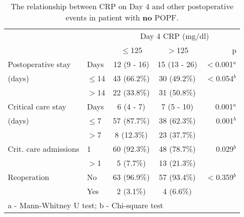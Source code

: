 \begin{table}[p]
	\centering
	\caption{The relationship between CRP on Day 4 and other postoperative events in patient with \textbf{no} POPF.}
	\label{table:crp_comp_CRP4_vs_LOS}
	\renewcommand{\arraystretch}{1.2} %
	\begin{tabular}{|l l | c c r |}
		\hline
		                      &          &  \multicolumn{3}{c|}{Day 4 CRP (mg/dl)}   \\
		                      &          & $\leq$125   & $>$125       & p            \\ \hline
		Postoperative stay    & Days     & 12 (9 - 16) & 15 (13 - 26) & $<$0.001$^a$ \\
		(days)                & $\leq$14 & 43 (66.2\%) & 30 (49.2\%)  & $<$0.054$^b$ \\
		                      & $>$14    & 22 (33.8\%) & 31 (50.8\%)  &  \\
		Critical care stay    & Days     & 6 (4 - 7)   & 7 (5 - 10)   & 0.001$^a$    \\
		(days)                & $\leq$7  & 57 (87.7\%) & 38 (62.3\%)  & 0.001$^b$    \\
		                      & $>$7     & 8 (12.3\%)  & 23 (37.7\%)  &  \\
		Crit. care admissions & 1        & 60 (92.3\%) & 48 (78.7\%)  & 0.029$^b$    \\
		                      & $>$1     & 5 (7.7\%)   & 13 (21.3\%)  &  \\
		Reoperation           & No       & 63 (96.9\%) & 57 (93.4\%)  & $<$0.359$^b$ \\
		                      & Yes      & 2 (3.1\%)   & 4 (6.6\%)    &  \\ \hline
		\multicolumn{5}{l}{a - Mann-Whitney U test; b - Chi-square test}
	\end{tabular}
\end{table}



